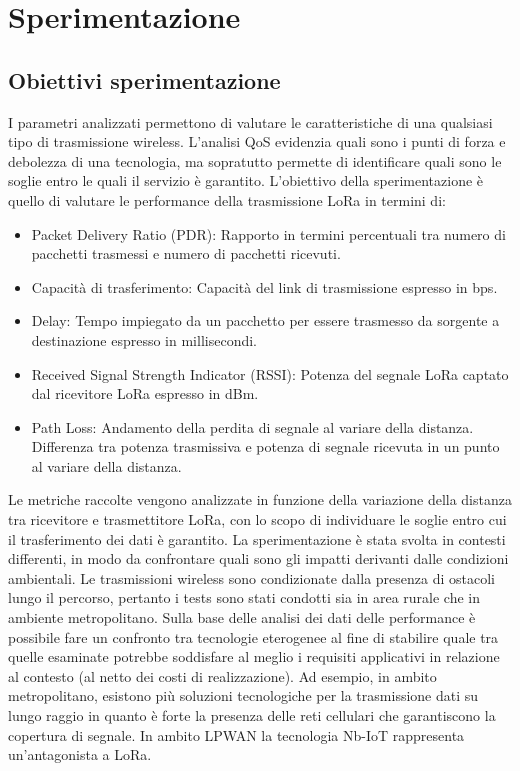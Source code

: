 \documentclass[12pt,a4paper,openright,twoside]{report}
\begin{document}
\chapter{Sperimentazione} 
\section{Obiettivi sperimentazione}
I parametri analizzati permettono di valutare le caratteristiche di una qualsiasi tipo di trasmissione wireless. L'analisi QoS evidenzia quali sono i punti di forza e debolezza di una tecnologia, ma sopratutto permette di identificare quali sono le soglie entro le quali il servizio \`e garantito. 
L'obiettivo della sperimentazione \`e quello di valutare le performance della trasmissione LoRa in termini di:
\begin{itemize}                       
\item Packet Delivery Ratio (PDR): Rapporto in termini percentuali tra numero di pacchetti trasmessi e numero di pacchetti ricevuti.
\item Capacit\`a di trasferimento: Capacit\`a del link di trasmissione espresso in bps.
\item Delay: Tempo impiegato da un pacchetto per essere trasmesso da sorgente a destinazione espresso in millisecondi.
\item Received Signal Strength Indicator (RSSI): Potenza del segnale LoRa captato dal ricevitore LoRa espresso in dBm.
\item Path Loss: Andamento della perdita di segnale al variare della distanza. Differenza tra potenza trasmissiva e potenza di segnale ricevuta in un punto al variare della distanza.
\end{itemize}
Le metriche raccolte vengono analizzate in funzione della variazione della distanza tra ricevitore e trasmettitore LoRa, con lo scopo di individuare le soglie entro cui il trasferimento dei dati \`e garantito. 
La sperimentazione \`e stata svolta in contesti differenti, in modo da confrontare quali sono gli impatti derivanti dalle condizioni ambientali.
Le trasmissioni wireless sono condizionate dalla presenza di ostacoli lungo il percorso, pertanto i tests sono stati condotti sia in area rurale che in ambiente metropolitano.    
Sulla base delle analisi dei dati delle performance \`e possibile fare un confronto tra tecnologie eterogenee al fine di stabilire quale tra quelle esaminate potrebbe soddisfare al meglio i requisiti applicativi in relazione al contesto (al netto dei costi di realizzazione). 
Ad esempio, in ambito metropolitano, esistono pi\`u soluzioni tecnologiche per la trasmissione dati su lungo raggio in quanto \`e forte la presenza delle reti cellulari che garantiscono la copertura di segnale. In ambito LPWAN la tecnologia Nb-IoT rappresenta un'antagonista a LoRa. 
\end{document}
